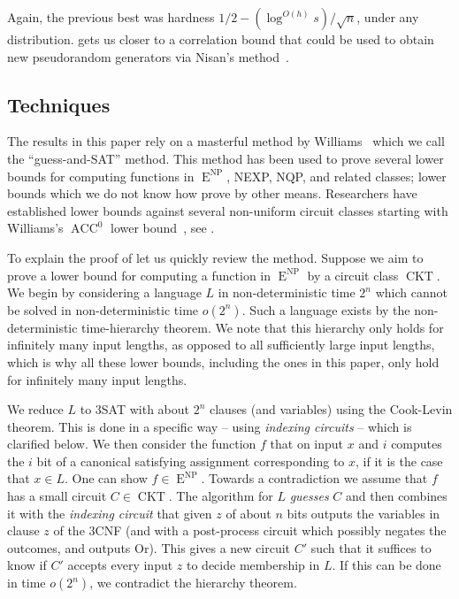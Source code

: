 \documentclass{toc}
\DeclareMathOperator{\ACC}{\mathrm{ACC}}  %
\DeclareMathOperator{\NP}{\mathrm{NP}}  %
\DeclareMathOperator{\EEE}{\mathrm{E}}  %
\DeclareMathOperator{\CKT}{\mathrm{CKT}}  %
\begin{document}
Again, the previous best was hardness $1/2-(\log^{O(h)}s)/\sqrt{n}$,
under any distribution.  gets us closer
to a correlation bound that could be used to obtain new pseudorandom
generators via Nisan's method~\cite{Nis91}.

\subsection{Techniques \label{subsec:Techniques}}

The results in this paper rely on a masterful method by Williams~\cite{Williams13-Improving}
which we call the ``guess-and-SAT'' method. This method has been
used to prove several lower bounds for computing functions in $\EEE^{\NP}$, NEXP, NQP,
and related classes; lower bounds which we do not know how prove by
other means. Researchers have established lower bounds against several
non-uniform circuit classes starting with
%
Williams's  %
$\ACC^{0}$ lower
bound~\cite{Williams14-acc-jacm}, see \cite{Williams11,Williams13,Williams14,AlmanCW16,Tamaki16,DBLP:journals/eccc/Chen19,DBLP:conf/latin/ChenOS18,DBLP:conf/stoc/MurrayW18,DBLP:conf/mfcs/RajgopalS018,AlmanC19,VyasWilliams20,ChenRen20}.

To explain the proof of 
let us quickly review the method. Suppose we aim to prove a lower
bound for computing a function in $\EEE^{\NP}$ by a circuit class $\CKT$.
We begin by considering a language $L$ in non-deterministic time
$2^{n}$ which cannot be solved in non-deterministic time $o(2^{n})$.
Such a language exists by the non-deterministic time-hierarchy theorem.
We note that this hierarchy only holds for infinitely many input lengths,
as opposed to all sufficiently large input lengths, which is why all
these lower bounds, including the ones in this paper, only hold for
infinitely many input lengths.

We reduce $L$ to 3SAT with about $2^{n}$ clauses (and variables)
using the Cook-Levin theorem. This is done in a specific way -- using
\emph{indexing circuits} -- which is clarified below. We then consider
the function $f$ that on input $x$ and $i$ computes the $i$ bit
of a canonical satisfying assignment corresponding to $x$, if it
is the case that $x\in L$. One can show $f\in \EEE^{\NP}$. Towards a
contradiction we assume that $f$ has a small circuit $C\in \CKT$.
The algorithm for $L$ \emph{guesses }$C$ and then combines it with
the \emph{indexing circuit} that given $z$ of about $n$ bits outputs
the variables in clause $z$ of the 3CNF (and with a post-process
circuit which possibly negates the outcomes, and outputs Or). This
gives a new circuit $C'$ such that it suffices to know if $C'$ accepts
every input $z$ to decide membership in $L$. If this can be done
in time $o(2^{n})$, we contradict the hierarchy theorem.
\end{document}
